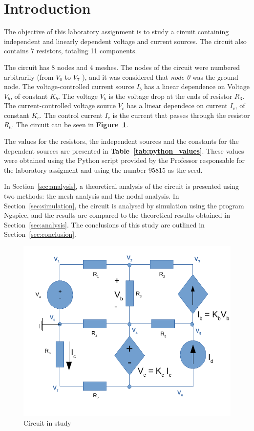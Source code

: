 \section{Introduction}
\label{sec:introduction}

\par The objective of this laboratory assignment is to study a circuit containing independent and 
linearly dependent voltage and current sources. The circuit also contains 7 resistors, totaling 11 components.\par
The circuit has 8 nodes and 4 meshes. The nodes of the circuit were numbered arbitrarily (from {\it$V_{0}$}  to {\it$V_{7}$} ), and it was considered that {\it node 0} was the ground node. The voltage-controlled current source {\it $I_b$} has a linear dependence on Voltage {\it $V_b$}, of constant {\it $K_b$}. The voltage {\it $V_b$} is the voltage drop at the ends of resistor {\it $R_3$}. The current-controlled voltage source {\it $V_c$} has a linear dependece on current {\it $I_c$}, of constant {\it $K_c$}. The control current {\it $I_c$} is the current that passes through the resistor {\it $R_6$}.
The circuit can be seen in \textbf{Figure~\ref{fig:circuit_t1}}.\par
The values for the resistors, the independent sources and the  constants for the dependent 
sources are presented in \textbf{Table~\ref{tab:python_values}}. These values were obtained using the
Python script provided by the Professor responsable for the laboratory assigment
and using the number 95815 as the seed.\par

In Section~\ref{sec:analysis}, a theoretical analysis of the circuit is
presented using two methods: the mesh analysis and the nodal analysis. In Section~\ref{sec:simulation}, the circuit is analysed by
simulation using the program Ngspice, and the results are compared to the theoretical results obtained in
Section~\ref{sec:analysis}. The conclusions of this study are outlined in
Section~\ref{sec:conclusion}.

\begin{figure}[h] \centering
\includegraphics[width=0.9\linewidth]{circuit_t1.pdf}
\caption{Circuit in study}
\label{fig:circuit_t1}
\end{figure}


